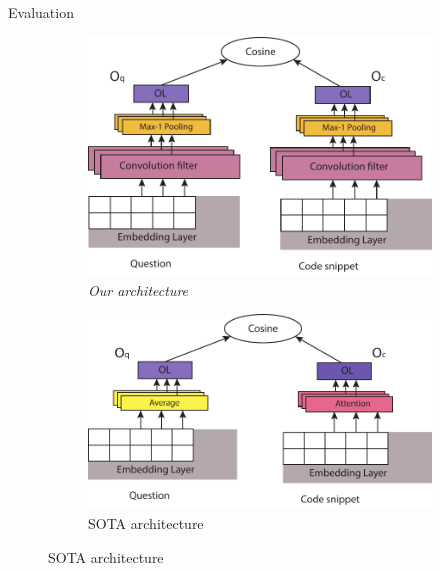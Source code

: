 \documentclass{beamer}
\begin{document}
    \begin{frame}{Evaluation}
      \begin{figure}
          \begin{subfigure}[h]{0.45\textwidth}
            \includegraphics[width=\textwidth]{resources/cnn-architecture-proposal-sbes.pdf}
            \caption{\textit{Our architecture}}
            \label{fig:our-architecture}
          \end{subfigure}
          \hspace{1em}%
          \begin{subfigure}[h]{0.45\textwidth}
            \includegraphics[width=\textwidth]{resources/unif-architecture-sbes.pdf}
            \caption{SOTA architecture}
            \label{fig:unif-architecture}
          \end{subfigure}
          

\end{figure}
\end{frame}
\end{document}
